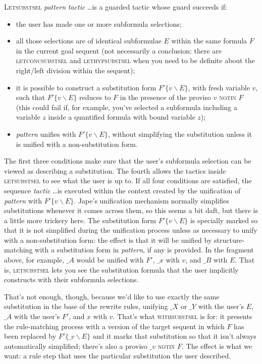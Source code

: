 \textsc{Letsubstsel} \textit{pattern} \textit{tactic} \dots  is a guarded tactic whose guard succeeds if:
\begin{itemize}
\item the user has made one or more subformula selections;
\item all those selections are of identical subformulae $E$ within the same formula $F$ in the current goal sequent (not necessarily a conclusion: there are \textsc{letconcsubstsel} and \textsc{lethypsubstsel} when you need to be definite about the right/left division within the sequent);
\item it is possible to construct a substitution form $F'\{v\backslash E\}$, with fresh variable $v$, such that $F'\{v\backslash E\}$ reduces to $F$ in the presence of the proviso $v$ \textsc{notin} $F$ (this could fail if, for example, you've selected a subformula including a variable $z$ inside a quantified formula with bound variable $z$);
\item \textit{pattern} unifies with $F'\{v\backslash E\}$, without simplifying the substitution unless it is unified with a non-substitution form.
\end{itemize}

The first three conditions make sure that the user's subformula selection can be viewed as describing a substitution. The fourth allows the tactics inside \textsc{letsubstsel} to see what the user is up to. If all four conditions are satisfied, the sequence \textit{tactic} \dots  is executed within the context created by the unification of \textit{pattern} with $F'\{v\backslash E\}$. Jape's unification mechanism normally simplifies substitutions whenever it comes across them, so this seems a bit daft, but there is a little more trickery here. The substitution form $F'\{v\backslash E\}$ is specially marked so that it is not simplified during the unification process unless as necessary to unify with a non-substitution form: the effect is that it will be unified by structure-matching with a substitution form in \textit{pattern}, if any is provided. In the fragment above, for example, $\_A$ would be unified with $F'$, $\_x$ with $v$, and $\_B$ with $E$. That is, \textsc{letsubstsel} lets you see the substitution formula that the user implicitly constructs with their subformula selections.

That's not enough, though, because we'd like to use exactly the same substitution in the base of the rewrite rules, unifying $\_X$ or $\_Y$ with the user's $E$, $\_A$ with the user's $F'$, and $x$ with $v$. That's what \textsc{withsubstsel} is for: it presents the rule-matching process with a version of the target sequent in which $F$ has been replaced by $F'\{\_v\backslash E\}$ and it marks that substitution so that it isn't always automatically simplified; there's also a proviso $\_v$ \textsc{notin} $F$. The effect is what we want: a rule step that uses the particular substitution the user described.

